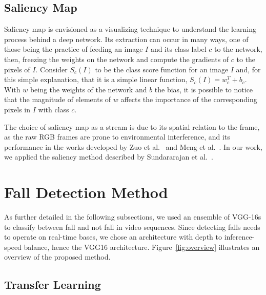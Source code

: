 \documentclass[conference]{IEEEtran}
\begin{document}
\subsection{Saliency Map}
\label{sec:saliency}

Saliency map is envisioned as a visualizing technique to understand the learning process behind a deep network. Its extraction can occur in many ways, one of those being the practice of feeding an image $I$ and its class label $c$ to the network, then, freezing the weights on the network and compute the gradients of $c$ to the pixels of $I$. Consider $S_c(I)$ to be the class score function for an image $I$ and, for this simple explanation, that it is a simple linear function, $S_c(I) = w_c^T + b_c$. With $w$ being the weights of the network and $b$ the bias, it is possible to notice that the magnitude of elements of $w$ affects the importance of the corresponding pixels in $I$ with class $c$.\par
The choice of saliency map as a stream is due to its spatial relation to the frame, as the raw RGB frames are prone to environmental interference, and its performance in the works developed by Zuo et al.~\cite{zuo2019enhanced} and Meng et al.~\cite{Meng2018interpretable}. In our work, we applied the saliency method described by Sundararajan et al.~\cite{sundararajan2017axiomatic}.

\section{Fall Detection Method}
\label{sec:method}

As further detailed in the following subsections, we used an ensemble of VGG-16s to classify between fall and not fall in video sequences. Since detecting falls needs to operate on real-time bases, we chose an architecture with depth to inference-speed balance, hence the VGG16 architecture. Figure~\ref{fig:overview} illustrates an overview of the proposed method.

\subsection{Transfer Learning}
\end{document}
